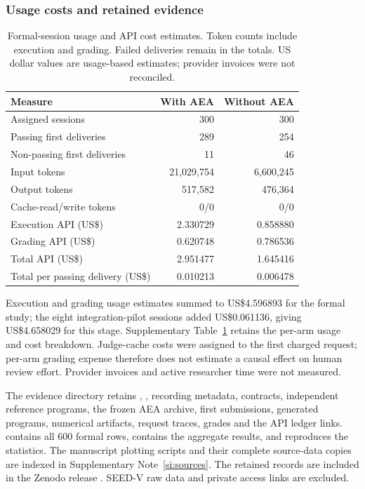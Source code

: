 \subsubsection*{Usage costs and retained evidence}

\begin{table}[!htbp]
\centering\small
\caption{Formal-session usage and API cost estimates. Token counts include execution and grading. Failed deliveries remain in the totals. US dollar values are usage-based estimates; provider invoices were not reconciled.}
\label{tab:paired-costs}
\begin{tabular}{lrr}
\toprule
Measure & With AEA & Without AEA \\
\midrule
Assigned sessions & 300 & 300 \\
Passing first deliveries & 289 & 254 \\
Non-passing first deliveries & 11 & 46 \\
Input tokens & 21,029,754 & 6,600,245 \\
Output tokens & 517,582 & 476,364 \\
Cache-read/write tokens & 0/0 & 0/0 \\
Execution API (US\$) & 2.330729 & 0.858880 \\
Grading API (US\$) & 0.620748 & 0.786536 \\
Total API (US\$) & 2.951477 & 1.645416 \\
Total per passing delivery (US\$) & 0.010213 & 0.006478 \\
\bottomrule
\end{tabular}
\end{table}

Execution and grading usage estimates summed to US\$4.596893 for the formal study; the eight integration-pilot sessions added US\$0.061136, giving US\$4.658029 for this stage. Supplementary Table~\ref*{tab:paired-costs} retains the per-arm usage and cost breakdown. Judge-cache costs were assigned to the first charged request; per-arm grading expense therefore does not estimate a causal effect on human review effort. Provider invoices and active researcher time were not measured.

The evidence directory  retains , , recording metadata, contracts, independent reference programs, the frozen AEA archive, first submissions, generated programs, numerical artifacts, request traces, grades and the API ledger links.  contains all 600 formal rows,  contains the aggregate results, and  reproduces the statistics. The manuscript plotting scripts and their complete source-data copies are indexed in Supplementary Note~\ref*{si:sources}. The retained records are included in the Zenodo release \citep{Hou2026AEAEvidence}. SEED-V raw data and private access links are excluded.


